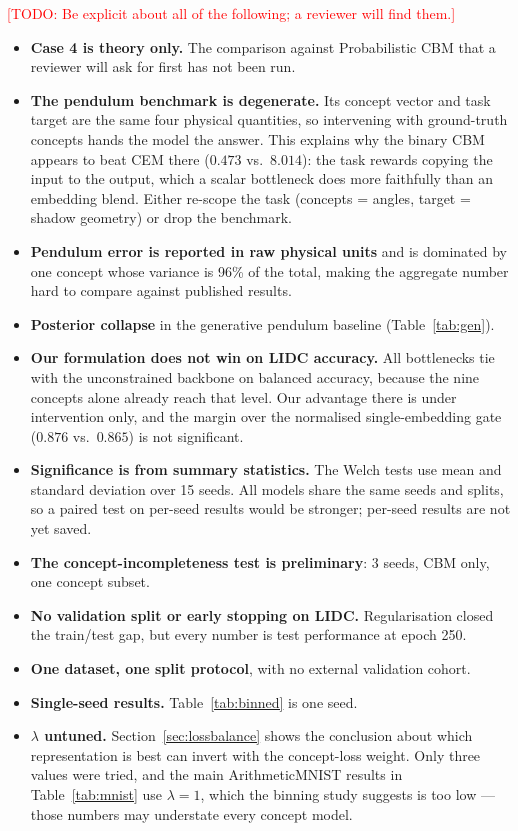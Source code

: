 \documentclass[11pt]{article}
\newcommand{\todo}[1]{\textcolor{red}{[TODO: #1]}}
\begin{document}
\todo{Be explicit about all of the following; a reviewer will find them.}
\begin{itemize}
  \item \textbf{Case 4 is theory only.} The comparison against Probabilistic
        CBM \citep{kim2023probabilistic} that a reviewer will ask for first has
        not been run.
  \item \textbf{The pendulum benchmark is degenerate.} Its concept vector and
        task target are the same four physical quantities, so intervening with
        ground-truth concepts hands the model the answer. This explains why the
        binary CBM appears to beat CEM there ($0.473$ vs.\ $8.014$): the task
        rewards copying the input to the output, which a scalar bottleneck does
        more faithfully than an embedding blend. Either re-scope the task
        (concepts = angles, target = shadow geometry) or drop the benchmark.
  \item \textbf{Pendulum error is reported in raw physical units} and is
        dominated by one concept whose variance is 96\% of the total, making the
        aggregate number hard to compare against published results.
  \item \textbf{Posterior collapse} in the generative pendulum baseline
        (Table~\ref{tab:gen}).
  \item \textbf{Our formulation does not win on LIDC accuracy.} All
        bottlenecks tie with the unconstrained backbone on balanced accuracy,
        because the nine concepts alone already reach that level. Our
        advantage there is under intervention only, and the margin over the
        normalised single-embedding gate ($0.876$ vs.\ $0.865$) is not
        significant.
  \item \textbf{Significance is from summary statistics.} The Welch tests use
        mean and standard deviation over 15 seeds. All models share the same
        seeds and splits, so a paired test on per-seed results would be
        stronger; per-seed results are not yet saved.
  \item \textbf{The concept-incompleteness test is preliminary}: 3 seeds, CBM
        only, one concept subset.
  \item \textbf{No validation split or early stopping on LIDC.} Regularisation
        closed the train/test gap, but every number is test performance at
        epoch 250.
  \item \textbf{One dataset, one split protocol}, with no external validation
        cohort.
  \item \textbf{Single-seed results.} Table~\ref{tab:binned} is one seed.
  \item \textbf{$\lambda$ untuned.} Section~\ref{sec:lossbalance} shows the
        conclusion about which representation is best can invert with the
        concept-loss weight. Only three values were tried, and the main
        ArithmeticMNIST results in Table~\ref{tab:mnist} use $\lambda = 1$,
        which the binning study suggests is too low --- those numbers may
        understate every concept model.
\end{itemize}
\end{document}
